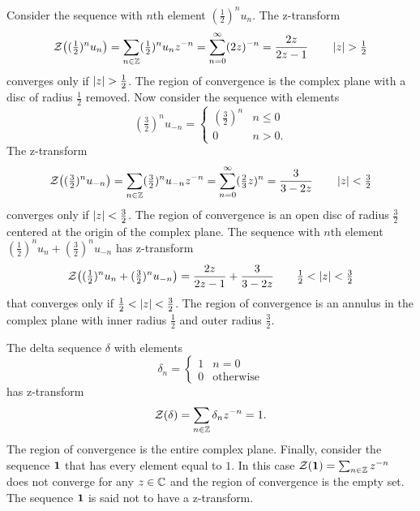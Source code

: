 Consider the sequence with $n$th element $(\tfrac{1}{2})^{n} u_n$.  The z-transform
\[
{\mathcal Z}\big( (\tfrac{1}{2})^{n} u_n\big) = \sum_{n \in {\mathbb Z}} (\tfrac{1}{2})^{n} u_n z^{-n} = \sum_{n=0}^\infty (2z)^{-n} = \frac{2z}{2z - 1} \qquad \left\vert z \right\vert > \tfrac{1}{2} 
\]
converges only if $\left\vert z \right\vert > \tfrac{1}{2}$.  The region of convergence is the complex plane with a disc of radius $\tfrac{1}{2}$ removed.  Now consider the sequence with elements 
\[
(\tfrac{3}{2})^{n} u_{-n} =  \begin{cases} 
(\tfrac{3}{2})^{n} & n \leq 0 \\
0 & n > 0.
\end{cases}
\]
The z-transform
\[
{\mathcal Z}\big( (\tfrac{3}{2})^n u_{-n} \big) = \sum_{n \in {\mathbb Z}} (\tfrac{3}{2})^{n} u_{-n} z^{-n} = \sum_{n=0}^\infty (\tfrac{2}{3} z)^{n} = \frac{3}{3 - 2z} \qquad \left\vert z \right\vert < \tfrac{3}{2}
\]
converges only if $\left\vert z \right\vert < \tfrac{3}{2}$.  The region of convergence is an open disc of radius $\frac{3}{2}$ centered at the origin of the complex plane.  The sequence with $n$th element $(\tfrac{1}{2})^{n} u_n + (\frac{3}{2})^{n} u_{-n}$ has z-transform
\[
{\mathcal Z}\big((\tfrac{1}{2})^{n} u_n + (\tfrac{3}{2})^{n} u_{-n}\big) =  \frac{2z}{2z - 1} + \frac{3}{3 - 2z} \qquad \tfrac{1}{2} < \left\vert z \right\vert < \tfrac{3}{2}
\]
that converges only if $\tfrac{1}{2} < \left\vert z \right\vert < \tfrac{3}{2}$.  The region of convergence is an annulus in the complex plane with inner radius $\tfrac{1}{2}$ and outer radius $\tfrac{3}{2}$.

The delta sequence $\delta$ with elements
\[
\delta_n = \begin{cases}
1 & n = 0 \\
0 & \text{otherwise}
\end{cases}
\]  
has z-transform
\[
{\mathcal Z}(\delta) = \sum_{n \in {\mathbb Z}} \delta_n z^{-n} = 1.
\]
The region of convergence is the entire complex plane.  Finally, consider the sequence $\mathbf{1}$ that has every element equal to $1$.  In this case ${\mathcal Z}(\mathbf{1}) = \sum_{n \in {\mathbb Z}} z^{-n}$ does not converge for any $z \in {\mathbb C}$ and the region of convergence is the empty set.  The sequence $\mathbf{1}$ is said not to have a z-transform.

